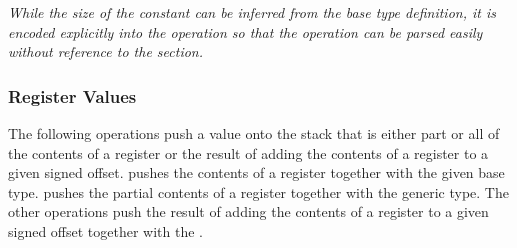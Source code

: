 \begin{enumerate}[1. ]
\textit{While the size of the constant can be inferred from the base type
definition, it is encoded explicitly into the operation so that the
operation can be parsed easily without reference to the \dotdebuginfo{}
section.}

\end{enumerate}

\subsubsection{Register Values}
\label{chap:registervalues}
The following operations push a value onto the stack that is either
\bb
part or all of
\eb
the contents of a register or the result of adding the contents of a
register to a given signed offset.
\DWOPregvaltype{} pushes the contents of
\bb
a
\eb
register together with the given base type.
\bb
\DWOPregvalbits{} pushes the partial contents of
a register together with the generic type.
\eb
The other operations
push the result of adding the contents of a register to a given
signed offset together with the \generictype.

